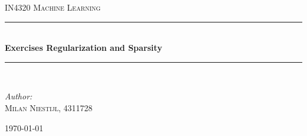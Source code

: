 \documentclass [a4paper] {report}
\begin{document}
	
	\begin{titlepage}
		\begin{center}
			
			\textsc{\LARGE IN4320 Machine Learning}\\[1.25cm]
			
			\rule{\linewidth}{0.5mm}\\[1.0cm]
			{\huge \bfseries Exercises Regularization and Sparsity }\\[0.6cm]
			\rule{\linewidth}{0.5mm}\\[1.5cm]
			
			\begin{minipage}{0.4\textwidth}
				\begin{flushleft} \large	
					\emph{Author:}\\
					\textsc{Milan Niestijl, 4311728}
				\end{flushleft}
			\end{minipage}
			
			\vfill
			{\large \today}
		\end{center}
	\end{titlepage}
	
\end{document}
